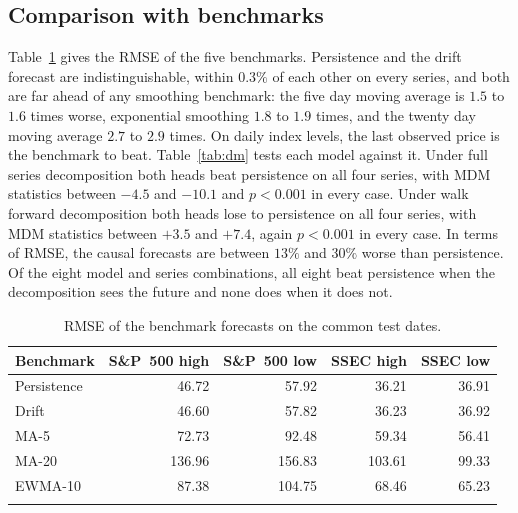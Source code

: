 \documentclass[pdflatex,sn-mathphys-num]{sn-jnl}%
\theoremstyle{thmstyleone}%
\theoremstyle{thmstyletwo}%
\theoremstyle{thmstylethree}%
\begin{document}
\subsection{Comparison with benchmarks}
Table~\ref{tab:baselines} gives the RMSE of the five benchmarks. Persistence
and the drift forecast are indistinguishable, within $0.3\%$ of each other on
every series, and both are far ahead of any smoothing benchmark: the five day
moving average is $1.5$ to $1.6$ times worse, exponential smoothing $1.8$ to
$1.9$ times, and the twenty day moving average $2.7$ to $2.9$ times. On daily
index levels, the last observed price is the benchmark to beat.
Table~\ref{tab:dm} tests each model against it. Under full series
decomposition both heads beat persistence on all four series, with MDM
statistics between $-4.5$ and $-10.1$ and $p<0.001$ in every case. Under walk
forward decomposition both heads lose to persistence on all four series, with
MDM statistics between $+3.5$ and $+7.4$, again $p<0.001$ in every case. In
terms of RMSE, the causal forecasts are between $13\%$ and $30\%$ worse than
persistence. Of the eight model and series combinations, all eight beat
persistence when the decomposition sees the future and none does when it does
not.

\begin{table}[ht]
\caption{RMSE of the benchmark forecasts on the common test dates.}
\label{tab:baselines}
\centering
\begin{tabular}{@{}lrrrr@{}}
\toprule
Benchmark & S\&P~500 high & S\&P~500 low & SSEC high & SSEC low \\
\midrule
Persistence & 46.72 & 57.92 & 36.21 & 36.91 \\
Drift & 46.60 & 57.82 & 36.23 & 36.92 \\
MA-5 & 72.73 & 92.48 & 59.34 & 56.41 \\
MA-20 & 136.96 & 156.83 & 103.61 & 99.33 \\
EWMA-10 & 87.38 & 104.75 & 68.46 & 65.23 \\
\botrule
\end{tabular}
\end{table}
\end{document}
